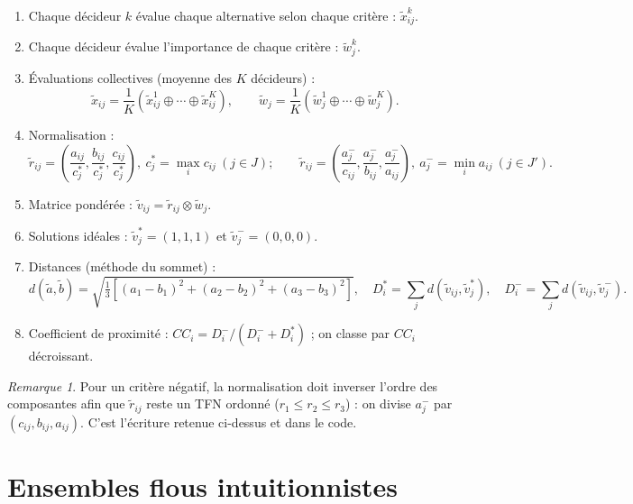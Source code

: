 \documentclass[11pt,a4paper]{report}
\theoremstyle{definition}
\theoremstyle{remark}
\newtheorem*{remarque}{Remarque}
\begin{document}
\begin{enumerate}
  \item Chaque décideur $k$ évalue chaque alternative selon chaque critère : $\tilde x_{ij}^k$.
  \item Chaque décideur évalue l'importance de chaque critère : $\tilde w_j^k$.
  \item Évaluations collectives (moyenne des $K$ décideurs) :
  \begin{equation}
    \tilde x_{ij}=\frac{1}{K}\left(\tilde x_{ij}^1\oplus\cdots\oplus\tilde x_{ij}^K\right),\qquad
    \tilde w_j=\frac{1}{K}\left(\tilde w_j^1\oplus\cdots\oplus\tilde w_j^K\right).
  \end{equation}
  \item Normalisation :
  \begin{equation}
    \tilde r_{ij}=\left(\frac{a_{ij}}{c_j^*},\frac{b_{ij}}{c_j^*},\frac{c_{ij}}{c_j^*}\right),\ c_j^*=\max_i c_{ij}\ (j\in J);\qquad
    \tilde r_{ij}=\left(\frac{a_j^-}{c_{ij}},\frac{a_j^-}{b_{ij}},\frac{a_j^-}{a_{ij}}\right),\ a_j^-=\min_i a_{ij}\ (j\in J').
  \end{equation}
  \item Matrice pondérée : $\tilde v_{ij}=\tilde r_{ij}\otimes\tilde w_j$.
  \item Solutions idéales : $\tilde v_j^*=(1,1,1)$ et $\tilde v_j^-=(0,0,0)$.
  \item Distances (méthode du sommet) :
  \begin{equation}
    d(\tilde a,\tilde b)=\sqrt{\tfrac13\left[(a_1-b_1)^2+(a_2-b_2)^2+(a_3-b_3)^2\right]},\quad
    D_i^*=\sum_j d(\tilde v_{ij},\tilde v_j^*),\quad D_i^-=\sum_j d(\tilde v_{ij},\tilde v_j^-).
  \end{equation}
  \item Coefficient de proximité : $CC_i=D_i^-/(D_i^-+D_i^*)$ ; on classe par $CC_i$ décroissant.
\end{enumerate}

\begin{remarque}
Pour un critère négatif, la normalisation doit inverser l'ordre des composantes afin que
$\tilde r_{ij}$ reste un TFN ordonné ($r_1\le r_2\le r_3$) : on divise $a_j^-$ par $(c_{ij},b_{ij},a_{ij})$.
C'est l'écriture retenue ci-dessus et dans le code.
\end{remarque}

\section{Ensembles flous intuitionnistes}
\end{document}
